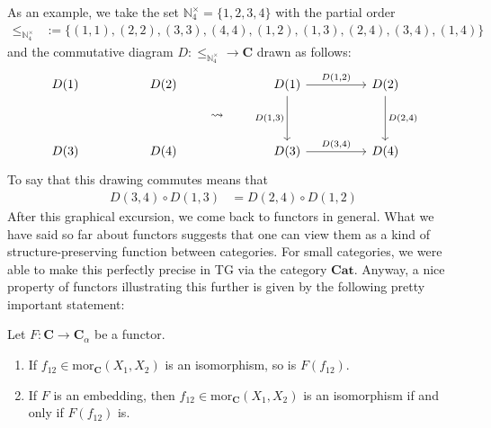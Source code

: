 As an example, we take the set $\mathbb{N}_{4}^{\times} = \lbrace 1,2,3,4 \rbrace$ with the partial order
\begin{align*}
  \leq_{\mathbb{N}_{4}^{\times}}
  &:=
  \lbrace
    (1,1),
    (2,2),
    (3,3),
    (4,4),
    (1,2),
    (1,3),
    (2,4),
    (3,4),
    (1,4)
  \rbrace
\end{align*}
and the commutative diagram $D \colon \pmb{\leq}_{\mathbb{N}_{4}^{\times}} \rightarrow \mathbf{C}$ drawn as follows:
\[
\begin{tikzcd}[sep=huge]
  D(1)
  &
  D(2)
  \\
  D(3)
  &
  D(4)
\end{tikzcd}
\qquad
\rightsquigarrow
\qquad
\begin{tikzcd}[sep=huge]
  D(1)
  \arrow{r}{D(1,2)}
  \arrow[swap]{d}{D(1,3)}
  &
  D(2)
  \arrow{d}{D(2,4)}
  \\
  D(3)
  \arrow{r}{D(3,4)}
  &
  D(4)
\end{tikzcd}
\]
To say that this drawing commutes means that
\begin{align*}
  D(3,4)
  \circ
  D(1,3)
  &=
  D(2,4)
  \circ
  D(1,2)
\end{align*}
After this graphical excursion, we come back to functors in general.
What we have said so far about functors suggests that one can view them as a kind of structure-preserving function between categories.
For small categories, we were able to make this perfectly precise in TG via the category $\mathbf{Cat}$.
Anyway, a nice property of functors illustrating this further is given by the following pretty important statement:
\\
\begin{thm}
\label{thm:catiso}
Let $F \colon \mathbf{C} \rightarrow \mathbf{C}_{\alpha}$ be a functor.
\begin{enumerate}
\item[(a)]
If $f_{12} \in \mathrm{mor}_{\mathbf{C}}(X_{1},X_{2})$ is an isomorphism, so is $F(f_{12})$.
\item[(b)]
If $F$ is an embedding, then $f_{12} \in \mathrm{mor}_{\mathbf{C}}(X_{1},X_{2})$ is an isomorphism if and only if $F(f_{12})$ is.
\end{enumerate}
\end{thm}

